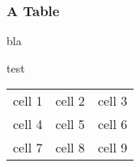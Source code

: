 \documentclass{beamer}
\begin{document}
\begin{frame}
    \frametitle{A Table}


    bla\pause 

    test\pause


        \begin{tabu}{lll}
                cell 1 & cell 2 & cell 3\\
            cell 4 & cell 5 & cell 6\\
            cell 7 & cell 8 & cell 9 
            \setcounter{totalrows}{\thetaburow}           
        \end{tabu}

\end{frame}
\end{document}
